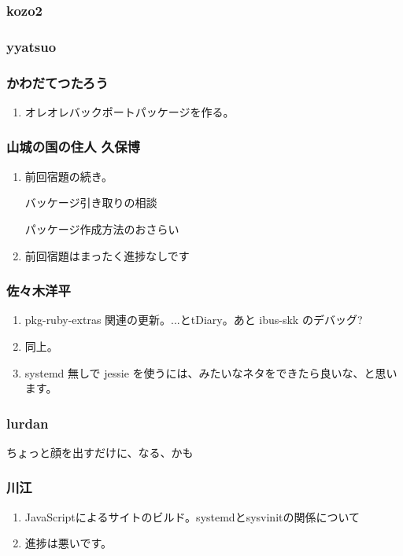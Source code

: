 \documentclass[cjk,dvipdfmx,10pt,compress,%
hyperref={bookmarks=true,bookmarksnumbered=true,bookmarksopen=false,%
colorlinks=false,%
pdftitle={第 89 回 関西 Debian 勉強会},%
pdfauthor={倉敷・のがた・佐々木・かわだ・八津尾},%
pdfsubject={資料},%
}]{beamer}
\begin{document}
\begin{frame}
  \frametitle{ kozo2 }
\end{frame}

\begin{frame}
  \frametitle{ yyatsuo }
\end{frame}

\begin{frame}
  \frametitle{ かわだてつたろう }
  \begin{enumerate}
  \item オレオレバックポートパッケージを作る。
  \end{enumerate}
\end{frame}

\begin{frame}
  \frametitle{ 山城の国の住人 久保博 }

  \begin{enumerate}
  \item 前回宿題の続き。

    バッケージ引き取りの相談

    パッケージ作成方法のおさらい

  \item 前回宿題はまったく進捗なしです

  \end{enumerate}
\end{frame}

\begin{frame}
  \frametitle{ 佐々木洋平 }
  \begin{enumerate}
  \item pkg-ruby-extras 関連の更新。...とtDiary。あと ibus-skk のデバッグ?
  \item 同上。
  \item systemd 無しで jessie を使うには、みたいなネタをできたら良いな、と思います。
  \end{enumerate}
\end{frame}

\begin{frame}
  \frametitle{ lurdan }
  ちょっと顔を出すだけに、なる、かも
\end{frame}

\begin{frame}
  \frametitle{ 川江 }
  \begin{enumerate}
  \item JavaScriptによるサイトのビルド。systemdとsysvinitの関係について
  \item 進捗は悪いです。
  \end{enumerate}
\end{frame}
\end{document}
